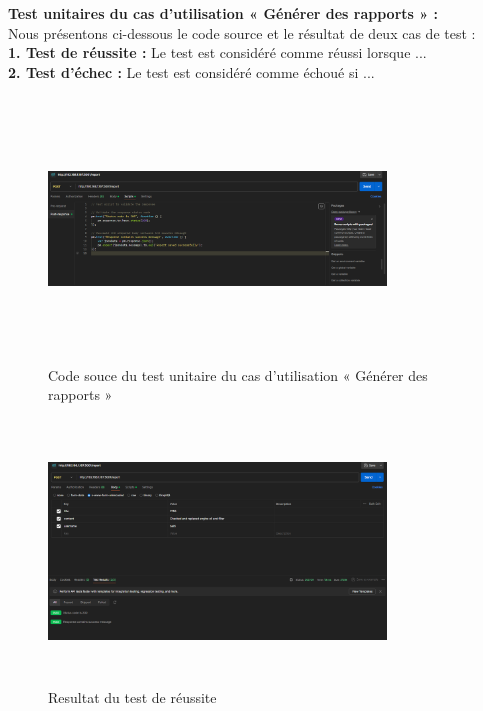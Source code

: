 \textbf{Test unitaires du cas d’utilisation « Générer des rapports » :}\\
\bigskip
Nous présentons ci-dessous le code source et le résultat de deux cas de test :\\



\textbf{1. Test de réussite :} Le test est considéré comme réussi lorsque ...\\
\textbf{2. Test d'échec :} Le test est considéré comme échoué si ...

\bigskip

\begin{figure}[h!]
    \centering
    \includegraphics[width=0.8\textwidth, height=7cm]{chap5.images/source test sprint 3.png}
    \caption{ Code souce du test unitaire du cas d’utilisation « Générer des rapports » }

\end{figure}


\begin{figure}[h!]
    \centering
    \includegraphics[width=0.8\textwidth, height=7cm]{chap5.images/succes sprint 3.png}
    \caption{ Resultat du test de réussite}

\end{figure}

